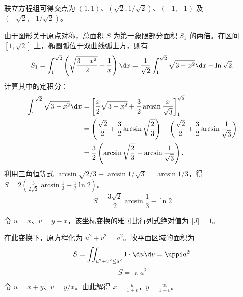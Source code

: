 \begin{solution}
     联立方程组可得交点为 $(1, 1)$、$(\sqrt{2}, 1/\sqrt{2})$、$(-1, -1)$ 及 $(-\sqrt{2}, -1/\sqrt{2})$。

    由于图形关于原点对称，总面积 $S$ 为第一象限部分面积 $S_1$ 的两倍。在区间 $[1, \sqrt{2}]$ 上，椭圆弧位于双曲线弧上方，则有
    \begin{equation}
        S_1 = \int_{1}^{\sqrt{2}} \left( \sqrt{\frac{3 - x^2}{2}} - \frac{1}{x} \right) \d x = \frac{1}{\sqrt{2}} \int_{1}^{\sqrt{2}} \sqrt{3 - x^2} \d x - \ln \sqrt{2}.
    \end{equation}
    计算其中的定积分：
    \begin{equation}
        \begin{aligned}
            \int_{1}^{\sqrt{2}} \sqrt{3 - x^2} \d x & = \left[ \frac{x}{2} \sqrt{3 - x^2} + \frac{3}{2} \arcsin \frac{x}{\sqrt{3}} \right]_{1}^{\sqrt{2}}                                                       \\
                                                    & = \left( \frac{\sqrt{2}}{2} + \frac{3}{2} \arcsin \sqrt{\frac{2}{3}} \right) - \left( \frac{\sqrt{2}}{2} + \frac{3}{2} \arcsin \frac{1}{\sqrt{3}} \right) \\
                                                    & = \frac{3}{2} \left( \arcsin \sqrt{\frac{2}{3}} - \arcsin \frac{1}{\sqrt{3}} \right).
        \end{aligned}
    \end{equation}
    利用三角恒等式 $\arcsin \sqrt{2/3} - \arcsin 1/\sqrt{3} = \arcsin 1/3$，得 $S = 2 \left( \frac{3}{2\sqrt{2}} \arcsin \frac{1}{3} - \frac{1}{2} \ln 2 \right)$。
    \begin{equation}
        S = \boxed{\frac{3\sqrt{2}}{2} \arcsin \frac{1}{3} - \ln 2}
    \end{equation}

     令 $u = x$、$v = y - x$，该坐标变换的雅可比行列式绝对值为 $|J| = 1$。

    在此变换下，原方程化为 $u^2 + v^2 = a^2$。故平面区域的面积为
    \begin{equation}
        S = \iint_{u^2 + v^2 \le a^2} 1 \cdot \d u \d v = \uppi a^2.
    \end{equation}
    \begin{equation}
        S = \boxed{\uppi a^2}
    \end{equation}

     令 $u = x + y$、$v = y/x$。由此解得 $x = \frac{u}{1+v}$，$y = \frac{uv}{1+v}$。


\end{solution}
